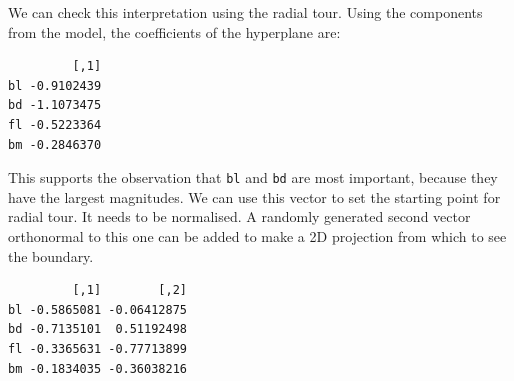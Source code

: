 \documentclass[
  letterpaper,
]{book}
\newenvironment{Shaded}{\begin{snugshade}}{\end{snugshade}}
\newcommand{\DecValTok}[1]{\textcolor[rgb]{0.68,0.00,0.00}{#1}}
\newcommand{\FunctionTok}[1]{\textcolor[rgb]{0.28,0.35,0.67}{#1}}
\newcommand{\NormalTok}[1]{\textcolor[rgb]{0.00,0.23,0.31}{#1}}
\newcommand{\OtherTok}[1]{\textcolor[rgb]{0.00,0.23,0.31}{#1}}
\newcommand{\SpecialCharTok}[1]{\textcolor[rgb]{0.37,0.37,0.37}{#1}}
\begin{document}
We can check this interpretation using the radial tour. Using the
components from the model, the coefficients of the hyperplane are:

\begin{Shaded}
\end{Shaded}

\begin{verbatim}
         [,1]
bl -0.9102439
bd -1.1073475
fl -0.5223364
bm -0.2846370
\end{verbatim}

This supports the observation that \texttt{bl} and \texttt{bd} are most
important, because they have the largest magnitudes. We can use this
vector to set the starting point for radial tour. It needs to be
normalised. A randomly generated second vector orthonormal to this one
can be added to make a 2D projection from which to see the boundary.

\begin{Shaded}
\end{Shaded}

\begin{verbatim}
         [,1]        [,2]
bl -0.5865081 -0.06412875
bd -0.7135101  0.51192498
fl -0.3365631 -0.77713899
bm -0.1834035 -0.36038216
\end{verbatim}
\end{document}
